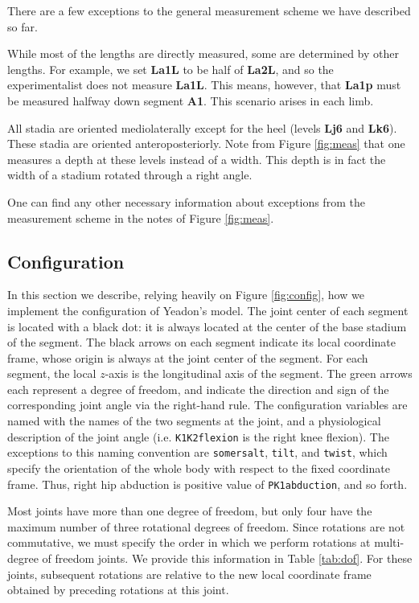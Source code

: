 \documentclass[10pt]{article}
\begin{document}
There are a few exceptions to the general measurement scheme we have described
so far.

While most of the lengths are directly measured, some are determined by other
lengths. For example, we set \textbf{La1L} to be half of \textbf{La2L}, and so
the experimentalist does not measure \textbf{La1L}. This means, however, that
\textbf{La1p} must be measured halfway down segment \textbf{A1}. This scenario
arises in each limb.

All stadia are oriented mediolaterally except for the heel (levels
\textbf{Lj6} and \textbf{Lk6}). These stadia are oriented anteroposteriorly.
Note from Figure \ref{fig:meas} that one measures a depth at these levels
instead of a width. This depth is in fact the width of a stadium rotated
through a right angle.

One can find any other necessary information about exceptions from the
measurement scheme in the notes of Figure \ref{fig:meas}.

\subsection*{Configuration}

In this section we describe, relying heavily on Figure \ref{fig:config}, how we
implement the configuration of Yeadon's model. The joint center of each
segment is located with a black dot: it is always located at the center of the
base stadium of the segment. The black arrows on each segment indicate its
local coordinate frame, whose origin is always at the joint center of the
segment. For each segment, the local $z$-axis is the longitudinal axis of the
segment. The green arrows each represent a degree of freedom, and indicate the
direction and sign of the corresponding joint angle via the right-hand rule.
The configuration variables are named with the names of the two segments at
the joint, and a physiological description of the joint angle (i.e.
\verb+K1K2flexion+ is the right knee flexion). The exceptions to this naming
convention are \verb+somersalt+, \verb+tilt+, and \verb+twist+, which specify
the orientation of the whole body with respect to the fixed coordinate frame.
Thus, right hip abduction is positive value of \verb+PK1abduction+, and so
forth.

Most joints have more than one degree of freedom, but only four have the
maximum number of three rotational degrees of freedom. Since rotations are not
commutative, we must specify the order in which we perform rotations at
multi-degree of freedom joints. We provide this information in Table
\ref{tab:dof}. For these joints, subsequent rotations are relative to the new
local coordinate frame obtained by preceding rotations at this joint.
\end{document}
